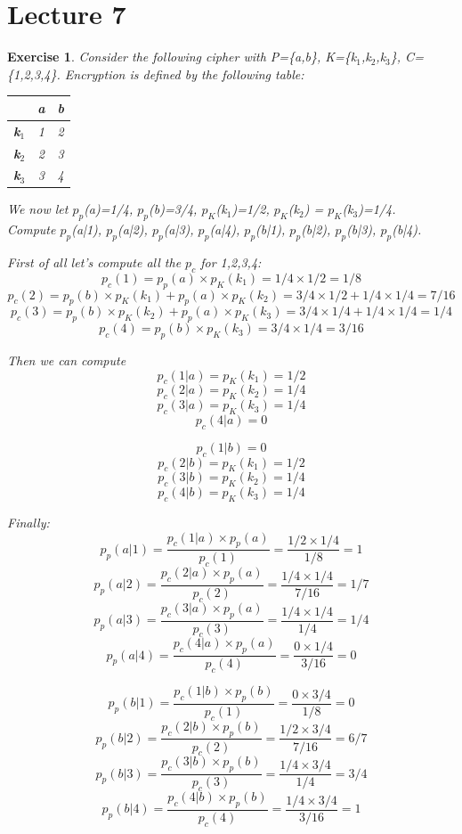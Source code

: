\documentclass[a4paper, 12pt]{report}
\newtheorem{exercise}{\textbf{Exercise}}
\begin{document}
\chapter*{Lecture 7}
\begin{exercise}
	Consider the following cipher with P=\{a,b\}, K=\{k$_1$,k$_2$,k$_3$\}, C=\{1,2,3,4\}. Encryption is defined by the following table:
		\begin{table}[H]
		\centering
		\begin{tabular}{|c | c c|} 
			\hline
			 & \textbf{a} & \textbf{b} \\ 
			\hline
			\textbf{k$_1$} & 1 & 2 \\ 
			\textbf{k$_2$} & 2 & 3 \\ 
			\textbf{k$_3$} & 3 & 4 \\ 
			\hline
		\end{tabular}
		\label{tab:exerciselec7}
	\end{table}
	We now let $p_p$(a)=1/4, $p_p$(b)=3/4, $p_K$(k$_1$)=1/2, $p_K$(k$_2$) = $p_K$(k$_3$)=1/4.\\
	Compute $p_p$(a|1), $p_p$(a|2), $p_p$(a|3), $p_p$(a|4), $p_p$(b|1), $p_p$(b|2), $p_p$(b|3), $p_p$(b|4).
	
	First of all let's compute all the $p_c$ for 1,2,3,4:
	\[p_c(1) = p_p(a)\times p_K(k_1) = 1/4\times 1/2 = 1/8\]
	\[p_c(2) = p_p(b)\times p_K(k_1)  + p_p(a)\times p_K(k_2)= 3/4\times 1/2 + 1/4\times 1/4 = 7/16\]
	\[p_c(3) = p_p(b)\times p_K(k_2)  + p_p(a)\times p_K(k_3)= 3/4\times 1/4 + 1/4\times 1/4 = 1/4\]
	\[p_c(4) = p_p(b)\times p_K(k_3) = 3/4\times 1/4 = 3/16\]
	
	Then we can compute
	\[p_c(1|a) = p_K(k_1) = 1/2\]
	\[p_c(2|a) = p_K(k_2) = 1/4\]
	\[p_c(3|a) = p_K(k_3) = 1/4\]
	\[p_c(4|a) = 0\]
	
	\[p_c(1|b) = 0\]
	\[p_c(2|b) = p_K(k_1) = 1/2\]
	\[p_c(3|b) = p_K(k_2) = 1/4\]
	\[p_c(4|b) = p_K(k_3) = 1/4\]
	
	Finally:
	\[p_p(a|1) = \frac{p_c(1|a)\times p_p(a)}{p_c(1)} = \frac{1/2\times 1/4}{1/8}= 1\]
	\[p_p(a|2) = \frac{p_c(2|a)\times p_p(a)}{p_c(2)} = \frac{1/4\times 1/4}{7/16}= 1/7\]
	\[p_p(a|3) = \frac{p_c(3|a)\times p_p(a)}{p_c(3)} = \frac{1/4\times 1/4}{1/4}= 1/4\]
	\[p_p(a|4) = \frac{p_c(4|a)\times p_p(a)}{p_c(4)} = \frac{0\times 1/4}{3/16}= 0\]
	
	\[p_p(b|1) = \frac{p_c(1|b)\times p_p(b)}{p_c(1)} = \frac{0\times 3/4}{1/8}= 0\]
	\[p_p(b|2) = \frac{p_c(2|b)\times p_p(b)}{p_c(2)} = \frac{1/2\times 3/4}{7/16}= 6/7\]
	\[p_p(b|3) = \frac{p_c(3|b)\times p_p(b)}{p_c(3)} = \frac{1/4\times 3/4}{1/4}= 3/4\]
	\[p_p(b|4) = \frac{p_c(4|b)\times p_p(b)}{p_c(4)} = \frac{1/4\times 3/4}{3/16}= 1\]
	
\end{exercise}
\end{document}
